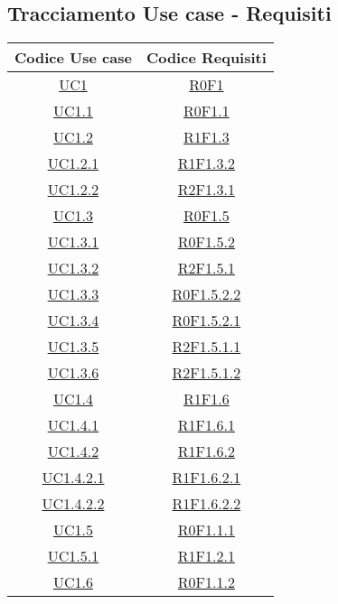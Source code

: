 \subsection{Tracciamento Use case - Requisiti}
\normalsize
\begin{longtable}{|c|c|}
	\hline
	\textbf{Codice Use case} & \textbf{Codice Requisiti} \\
	\hline
	\endhead
	\hyperlink{UC1}{UC1} & \hyperlink{R0F1}{R0F1}\\
	\hline
	\hyperlink{UC1.1}{UC1.1} & \hyperlink{R0F1.1}{R0F1.1}\\
	\hline
	\hyperlink{UC1.2}{UC1.2} & \hyperlink{R1F1.3}{R1F1.3}\\
	\hline
	\hyperlink{UC1.2.1}{UC1.2.1} & \hyperlink{R1F1.3.2}{R1F1.3.2}\\
	\hline
	\hyperlink{UC1.2.2}{UC1.2.2} & \hyperlink{R2F1.3.1}{R2F1.3.1}\\
	\hline
	\hyperlink{UC1.3}{UC1.3} & \hyperlink{R0F1.5}{R0F1.5}\\
	\hline
	\hyperlink{UC1.3.1}{UC1.3.1} & \hyperlink{R0F1.5.2}{R0F1.5.2}\\
	\hline
	\hyperlink{UC1.3.2}{UC1.3.2} & \hyperlink{R2F1.5.1}{R2F1.5.1}\\
	\hline
	\hyperlink{UC1.3.3}{UC1.3.3} & \hyperlink{R0F1.5.2.2}{R0F1.5.2.2}\\
	\hline
	\hyperlink{UC1.3.4}{UC1.3.4} & \hyperlink{R0F1.5.2.1}{R0F1.5.2.1}\\
	\hline
	\hyperlink{UC1.3.5}{UC1.3.5} & \hyperlink{R2F1.5.1.1}{R2F1.5.1.1}\\
	\hline
	\hyperlink{UC1.3.6}{UC1.3.6} & \hyperlink{R2F1.5.1.2}{R2F1.5.1.2}\\
	\hline
	\hyperlink{UC1.4}{UC1.4} & \hyperlink{R1F1.6}{R1F1.6}\\
	\hline
	\hyperlink{UC1.4.1}{UC1.4.1} & \hyperlink{R1F1.6.1}{R1F1.6.1}\\
	\hline
	\hyperlink{UC1.4.2}{UC1.4.2} & \hyperlink{R1F1.6.2}{R1F1.6.2}\\
	\hline
	\hyperlink{UC1.4.2.1}{UC1.4.2.1} & \hyperlink{R1F1.6.2.1}{R1F1.6.2.1}\\
	\hline
	\hyperlink{UC1.4.2.2}{UC1.4.2.2} & \hyperlink{R1F1.6.2.2}{R1F1.6.2.2}\\
	\hline
	\hyperlink{UC1.5}{UC1.5} & \hyperlink{R0F1.1.1}{R0F1.1.1}\\
	\hline
	\hyperlink{UC1.5.1}{UC1.5.1} & \hyperlink{R1F1.2.1}{R1F1.2.1}\\
	\hline
	\hyperlink{UC1.6}{UC1.6} & \hyperlink{R0F1.1.2}{R0F1.1.2}\\

\end{longtable}
